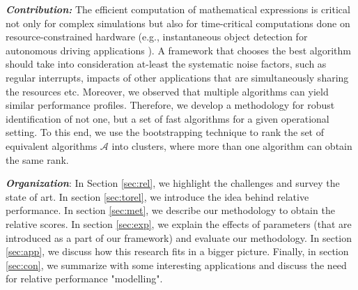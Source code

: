 \documentclass[conference]{IEEEtran}
\newcommand{\as}[1]{{\color{red} a: #1}}
\begin{document}
\textbf{\textit{Contribution:} }The efficient computation of mathematical expressions is critical not only for complex
simulations but also for time-critical computations done on resource-constrained hardware \cite{towardsEdgeComputing}
(e.g., instantaneous object detection for autonomous driving applications \cite{connectedvehicles}). A framework that
chooses the best algorithm should take into consideration at-least the systematic noise factors, such as  regular
interrupts, impacts of  other applications that are simultaneously sharing the resources etc. Moreover, we observed that
multiple algorithms can yield similar performance profiles. Therefore,  we develop a methodology for robust identification of not one, but a set of  fast algorithms for a given operational setting. To this end, we use the bootstrapping technique\cite{bootstrap} to rank the set of equivalent algorithms $\mathcal{A}$ into clusters, where more than one algorithm can obtain the same rank.

\textit{\textbf{Organization}}: In Section \ref{sec:rel}, we highlight the challenges and survey the state of art. In section \ref{sec:torel},  we introduce the idea behind relative performance. In section \ref{sec:met}, we describe our methodology to obtain the relative scores. In section \ref{sec:exp}, we explain the effects of parameters (that are introduced as a part of our framework) and evaluate our methodology. In section \ref{sec:app}, we discuss how this research fits in a bigger picture. Finally, in section \ref{sec:con}, we  summarize with some interesting applications and discuss the need for relative performance "modelling". 
  

%
\end{document}

